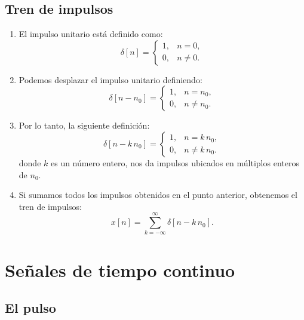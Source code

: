 \subsection{Tren de impulsos}

\begin{enumerate}
	\item El impulso unitario está definido como:
	\begin{equation}
		\delta[n] = 
		\begin{cases}
			1, & n = 0, \\
			0, & n \neq 0.
		\end{cases}
	\end{equation}
	
	\item Podemos desplazar el impulso unitario definiendo:
	\begin{equation}
		\delta[n - n_{0}] = 
		\begin{cases}
			1, & n = n_{0}, \\
			0, & n \neq n_{0}.
		\end{cases}
	\end{equation}
	
	\item Por lo tanto, la siguiente definición:
	\begin{equation}
		\delta[n - k \, n_{0}] = 
		\begin{cases}
			1, & n = k \, n_{0}, \\
			0, & n \neq k \, n_{0}.
		\end{cases}
	\end{equation}
	donde $k$ es un número entero, nos da impulsos ubicados en múltiplos enteros de $n_{0}$.
	
	\item Si sumamos todos los impulsos obtenidos en el punto anterior,
	obtenemos el tren de impulsos:
	\begin{equation}
		x[n] = \sum_{k=-\infty}^{\infty} \delta[n - k \, n_{0}].
	\end{equation}
	
\end{enumerate}


\section{Señales de tiempo continuo}

\subsection{El pulso}

